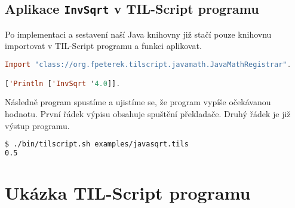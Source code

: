 \subsection{Aplikace \lstinline{InvSqrt} v TIL-Script programu}

Po implementaci a sestavení naší Java knihovny již stačí pouze knihovnu importovat v TIL-Script
programu a funkci aplikovat.

\begin{lstlisting}[caption={Aplikace InvSqrt}, language=Haskell]
Import "class://org.fpeterek.tilscript.javamath.JavaMathRegistrar".

['Println ['InvSqrt '4.0]].
\end{lstlisting}

Následně program spustíme a ujistíme se, že program vypíše očekávanou hodnotu. První řádek výpisu
obsahuje spuštění překladače. Druhý řádek je již výstup programu.

\begin{lstlisting}[caption={Aplikace InvSqrt}, language=Bash]
$ ./bin/tilscript.sh examples/javasqrt.tils
0.5
\end{lstlisting}

\section{Ukázka TIL-Script programu}

\endinput
